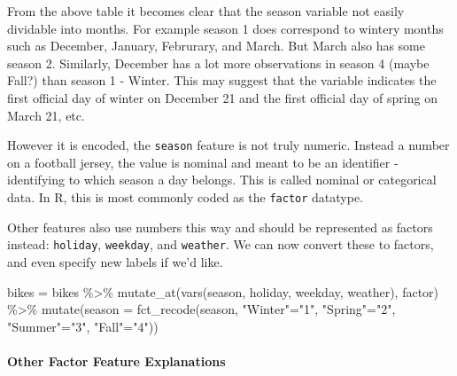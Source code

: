 \documentclass[
  letterpaper,
  DIV=11,
  numbers=noendperiod]{scrartcl}
\let\oldparagraph\paragraph
\renewcommand{\paragraph}[1]{\oldparagraph{#1}\mbox{}}
\newenvironment{Shaded}{\begin{snugshade}}{\end{snugshade}}
\newcommand{\AttributeTok}[1]{\textcolor[rgb]{0.40,0.45,0.13}{#1}}
\newcommand{\FunctionTok}[1]{\textcolor[rgb]{0.28,0.35,0.67}{#1}}
\newcommand{\NormalTok}[1]{\textcolor[rgb]{0.00,0.23,0.31}{#1}}
\newcommand{\OtherTok}[1]{\textcolor[rgb]{0.00,0.23,0.31}{#1}}
\newcommand{\SpecialCharTok}[1]{\textcolor[rgb]{0.37,0.37,0.37}{#1}}
\newcommand{\StringTok}[1]{\textcolor[rgb]{0.13,0.47,0.30}{#1}}
\begin{document}
From the above table it becomes clear that the season variable not
easily dividable into months. For example season 1 does correspond to
wintery months such as December, January, Februrary, and March. But
March also has some season 2. Similarly, December has a lot more
observations in season 4 (maybe Fall?) than season 1 - Winter. This may
suggest that the variable indicates the first official day of winter on
December 21 and the first official day of spring on March 21, etc.

However it is encoded, the \texttt{season} feature is not truly numeric.
Instead a number on a football jersey, the value is nominal and meant to
be an identifier - identifying to which season a day belongs. This is
called nominal or categorical data. In R, this is most commonly coded as
the \texttt{factor} datatype.

Other features also use numbers this way and should be represented as
factors instead: \texttt{holiday}, \texttt{weekday}, and
\texttt{weather}. We can now convert these to factors, and even specify
new labels if we'd like.

\begin{Shaded}
\begin{Highlighting}[]
\NormalTok{bikes }\OtherTok{=}\NormalTok{ bikes }\SpecialCharTok{\%\textgreater{}\%}
  \FunctionTok{mutate\_at}\NormalTok{(}\FunctionTok{vars}\NormalTok{(season, holiday, weekday, weather), factor) }\SpecialCharTok{\%\textgreater{}\%}
  \FunctionTok{mutate}\NormalTok{(}\AttributeTok{season =} \FunctionTok{fct\_recode}\NormalTok{(season, }\StringTok{"Winter"}\OtherTok{=}\StringTok{"1"}\NormalTok{, }
                                     \StringTok{"Spring"}\OtherTok{=}\StringTok{"2"}\NormalTok{,}
                                     \StringTok{"Summer"}\OtherTok{=}\StringTok{"3"}\NormalTok{,}
                                     \StringTok{"Fall"}\OtherTok{=}\StringTok{"4"}\NormalTok{))}
\end{Highlighting}
\end{Shaded}

\hypertarget{other-factor-feature-explanations}{%
\paragraph{Other Factor Feature
Explanations}\label{other-factor-feature-explanations}}
\end{document}
